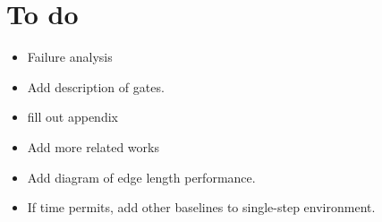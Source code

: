 \documentclass{article}
\begin{document}
\section{To do}
\begin{itemize}
  \item Failure analysis
  \item Add description of gates.
  \item fill out appendix
  \item Add more related works
  \item Add diagram of edge length performance.
  \item If time permits, add other baselines to single-step environment.
\end{itemize}



\end{document}
